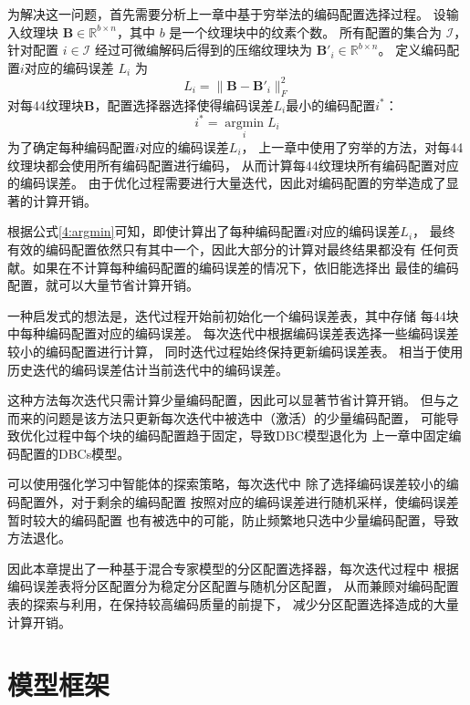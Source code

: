 为解决这一问题，首先需要分析上一章中基于穷举法的编码配置选择过程。
设输入纹理块 $\mathbf{B}\in\mathbb{R}^{b\times n}$，其中 $b$ 是一个纹理块中的纹素个数。
所有配置的集合为 $\mathcal{I}$，针对配置 $i\in\mathcal{I}$ 经过可微编解码后得到的压缩纹理块为 $\mathbf{B}'_i\in\mathbb{R}^{b\times n}$。
定义编码配置$i$对应的编码误差 $L_i$ 为
\begin{equation}
L_i=\|\mathbf{B}-\mathbf{B}'_i\|_F^2
\end{equation}
对每4\times4纹理块$\mathbf{B}$，配置选择器选择使得编码误差$L_i$最小的编码配置$i^*$：
\begin{equation}
    \label{4:argmin}
    i^*=\mathop{\arg\min}\limits_{i} L_i
\end{equation}
为了确定每种编码配置$i$对应的编码误差$L_i$，
上一章中使用了穷举的方法，对每4\times4纹理块都会使用所有编码配置进行编码，
从而计算每4\times4纹理块所有编码配置对应的编码误差。
由于优化过程需要进行大量迭代，因此对编码配置的穷举造成了显著的计算开销。

根据公式\ref{4:argmin}可知，即使计算出了每种编码配置$i$对应的编码误差$L_i$，
最终有效的编码配置依然只有其中一个，因此大部分的计算对最终结果都没有
任何贡献。如果在不计算每种编码配置的编码误差的情况下，依旧能选择出
最佳的编码配置，就可以大量节省计算开销。

一种启发式的想法是，迭代过程开始前初始化一个编码误差表，其中存储
每4\times4块中每种编码配置对应的编码误差。
每次迭代中根据编码误差表选择一些编码误差较小的编码配置进行计算，
同时迭代过程始终保持更新编码误差表。
相当于使用历史迭代的编码误差估计当前迭代中的编码误差。

这种方法每次迭代只需计算少量编码配置，因此可以显著节省计算开销。
但与之而来的问题是该方法只更新每次迭代中被选中（激活）的少量编码配置，
可能导致优化过程中每个块的编码配置趋于固定，导致DBC模型退化为
上一章中固定编码配置的DBCs模型。

可以使用强化学习中智能体的探索策略，每次迭代中
除了选择编码误差较小的编码配置外，对于剩余的编码配置
按照对应的编码误差进行随机采样，使编码误差暂时较大的编码配置
也有被选中的可能，防止频繁地只选中少量编码配置，导致方法退化。

因此本章提出了一种基于混合专家模型的分区配置选择器，每次迭代过程中
根据编码误差表将分区配置分为稳定分区配置与随机分区配置，
从而兼顾对编码配置表的探索与利用，在保持较高编码质量的前提下，
减少分区配置选择造成的大量计算开销。

\section{模型框架}

